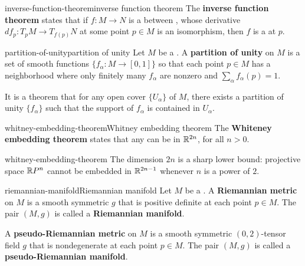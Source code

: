 \begin{topic}{inverse-function-theorem}{inverse function theorem}
    The \textbf{inverse function theorem} states that if $f \colon M \to N$ is a  between , whose derivative $df_p \colon T_p M \to T_{f(p)} N$ at some point $p \in M$ is an isomorphism, then $f$ is a  at $p$.
\end{topic}

\begin{topic}{partition-of-unity}{partition of unity}
    Let $M$ be a . A \textbf{partition of unity} on $M$ is a set of smooth functions $\{ f_\alpha \colon M \to [0, 1] \}$ so that each point $p \in M$ has a neighborhood where only finitely many $f_\alpha$ are nonzero and $\sum_\alpha f_\alpha(p) = 1$.
    
    It is a theorem that for any open cover $\{ U_\alpha \}$ of $M$, there exists a partition of unity $\{ f_\alpha \}$ such that the support of $f_\alpha$ is contained in $U_\alpha$.
\end{topic}

\begin{topic}{whitney-embedding-theorem}{Whitney embedding theorem}
    The \textbf{Whiteney embedding theorem} states that any  can be  in $\mathbb{R}^{2n}$, for all $n > 0$.
\end{topic}

\begin{example}{whitney-embedding-theorem}
    The dimension $2n$ is a sharp lower bound: projective space $\mathbb{R} P^n$ cannot be embedded in $\mathbb{R}^{2n - 1}$ whenever $n$ is a power of $2$.
\end{example}

\begin{topic}{riemannian-manifold}{Riemannian manifold}
    Let $M$ be a . A \textbf{Riemannian metric} on $M$ is a smooth symmetric  $g$ that is positive definite at each point $p \in M$. The pair $(M, g)$ is called a \textbf{Riemannian manifold}.
    
    A \textbf{pseudo-Riemannian metric} on $M$ is a smooth symmetric $(0, 2)$-tensor field $g$ that is nondegenerate at each point $p \in M$. The pair $(M, g)$ is called a \textbf{pseudo-Riemannian manifold}.
\end{topic}

